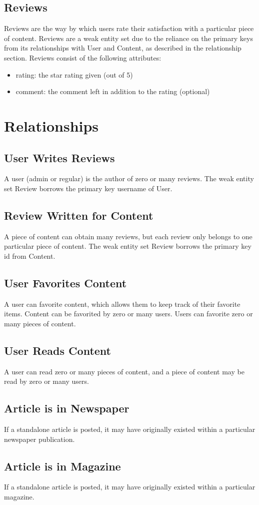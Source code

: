 \documentclass[letter, 12pt, titlepage]{article}
\begin{document}
			\subsection{Reviews}
			Reviews are the way by which users rate their satisfaction with a particular piece of content. Reviews are a weak entity set due to the reliance on the primary keys from its relationships with User and Content, as described in the relationship section. Reviews consist of the following attributes:
			\begin{itemize}
				\item rating: the star rating given (out of 5)
				\item comment: the comment left in addition to the rating (optional)
			\end{itemize}

	\section{Relationships}
		\subsection{User Writes Reviews}
			A user (admin or regular) is the author of zero or many reviews. The weak entity set Review borrows the primary key username of User.
		\subsection{Review Written for Content}
			A piece of content can obtain many reviews, but each review only belongs to one particular piece of content. The weak entity set Review borrows the primary key id from Content.
		\subsection{User Favorites Content}
			A user can favorite content, which allows them to keep track of their favorite items. Content can be favorited by zero or many users. Users can favorite zero or many pieces of content.	
		\subsection{User Reads Content}
			A user can read zero or many pieces of content, and a piece of content may be read by zero or many users.
		\subsection{Article is in Newspaper}
			If a standalone article is posted, it may have originally existed within a particular newspaper publication.
		\subsection{Article is in Magazine}
			If a standalone article is posted, it may have originally existed within a particular magazine.
\end{document}
